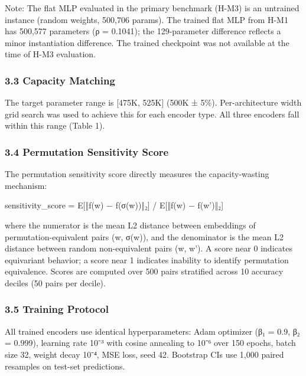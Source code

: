 Note: The flat MLP evaluated in the primary benchmark (H-M3) is an untrained instance (random weights, 500,706 params). The trained flat MLP from H-M1 has 500,577 parameters (ρ = 0.1041); the 129-parameter difference reflects a minor instantiation difference. The trained checkpoint was not available at the time of H-M3 evaluation.

\subsubsection{3.3 Capacity Matching}

The target parameter range is [475K, 525K] (500K ± 5\%). Per-architecture width grid search was used to achieve this for each encoder type. All three encoders fall within this range (Table 1).

\subsubsection{3.4 Permutation Sensitivity Score}

The permutation sensitivity score directly measures the capacity-wasting mechanism:

sensitivity_score = E[‖f(w) − f(σ(w))‖₂] / E[‖f(w) − f(w')‖₂]

where the numerator is the mean L2 distance between embeddings of permutation-equivalent pairs (w, σ(w)), and the denominator is the mean L2 distance between random non-equivalent pairs (w, w'). A score near 0 indicates equivariant behavior; a score near 1 indicates inability to identify permutation equivalence. Scores are computed over 500 pairs stratified across 10 accuracy deciles (50 pairs per decile).

\subsubsection{3.5 Training Protocol}

All trained encoders use identical hyperparameters: Adam optimizer (β₁ = 0.9, β₂ = 0.999), learning rate 10⁻³ with cosine annealing to 10⁻⁶ over 150 epochs, batch size 32, weight decay 10⁻⁴, MSE loss, seed 42. Bootstrap CIs use 1,000 paired resamples on test-set predictions.

